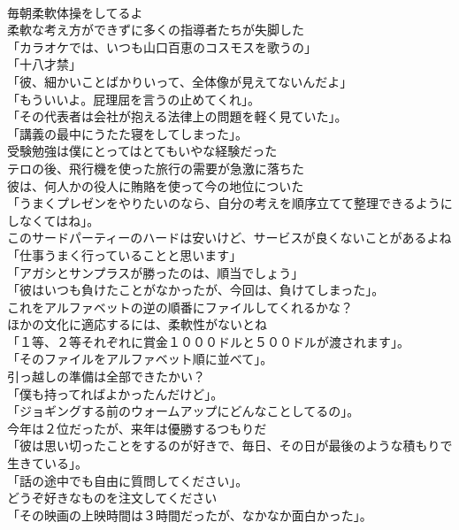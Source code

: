 \documentclass[8pt]{extreport}
\begin{document}
\begin{CJK}{UTF8}{min}
\\	毎朝柔軟体操をしてるよ	
\\	柔軟な考え方ができずに多くの指導者たちが失脚した	
\\	「カラオケでは、いつも山口百恵のコスモスを歌うの」	
\\	「十八才禁」	
\\	「彼、細かいことばかりいって、全体像が見えてないんだよ」	
\\	「もういいよ。屁理屈を言うの止めてくれ」。	
\\	「その代表者は会社が抱える法律上の問題を軽く見ていた」。	
\\	「講義の最中にうたた寝をしてしまった」。	
\\	受験勉強は僕にとってはとてもいやな経験だった	
\\	テロの後、飛行機を使った旅行の需要が急激に落ちた	
\\	彼は、何人かの役人に賄賂を使って今の地位についた	
\\	「うまくプレゼンをやりたいのなら、自分の考えを順序立てて整理できるようにしなくてはね」。	
\\	このサードパーティーのハードは安いけど、サービスが良くないことがあるよね	
\\	「仕事うまく行っていることと思います」	
\\	「アガシとサンプラスが勝ったのは、順当でしょう」	
\\	「彼はいつも負けたことがなかったが、今回は、負けてしまった」。	
\\	これをアルファベットの逆の順番にファイルしてくれるかな？	
\\	ほかの文化に適応するには、柔軟性がないとね	
\\	「１等、２等それぞれに賞金１０００ドルと５００ドルが渡されます」。	
\\	「そのファイルをアルファベット順に並べて」。	
\\	引っ越しの準備は全部できたかい？	
\\	「僕も持ってればよかったんだけど」。	
\\	「ジョギングする前のウォームアップにどんなことしてるの」。	
\\	今年は２位だったが、来年は優勝するつもりだ	
\\	「彼は思い切ったことをするのが好きで、毎日、その日が最後のような積もりで生きている」。	
\\	「話の途中でも自由に質問してください」。	
\\	どうぞ好きなものを注文してください	
\\	「その映画の上映時間は３時間だったが、なかなか面白かった」。	

\end{CJK}
\end{document}
